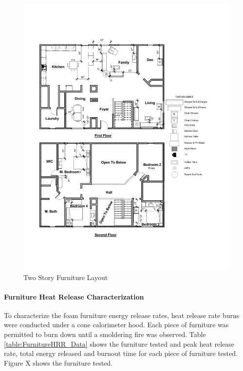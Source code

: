 \documentclass{article}
\begin{document}
\begin{figure}[H]
	\centering
	\includegraphics[width=\textwidth]{0_Images/Furniture/Two_Story_Furniture_Layout.pdf}
	\caption{Two Story Furniture Layout}
	\label{fig:TwoStoryFurniture}
\end{figure}

\paragraph{Furniture Heat Release Characterization} \mbox{}

To characterize the foam furniture energy release rates, heat release rate burns were conducted under a cone calorimeter hood. Each piece of furniture was permitted to burn down until a smoldering fire was observed. Table \ref{table:FurnitureHRR_Data} shows the furniture tested and peak heat release rate, total energy released and burnout time for each piece of furniture tested. Figure X shows the furniture tested. 
\end{document}
